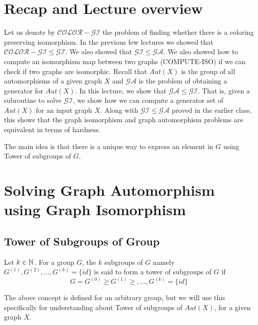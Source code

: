 
\newcommand{\cgi}{\mathcal{COLOR-GI}}
\newcommand{\compiso}{{\sf COMPUTE-ISO}}
\newcommand{\gi}{\mathcal{GI}}
\newcommand{\ga}{\mathcal{GA}}
\newcommand{\setstab}{ {\sf SETSTAB}}
\section{Recap and Lecture overview}
Let us denote by $\cgi$ the problem of finding whether there is a coloring
preserving isomorphism.  In the previous few lectures we showed that $\cgi \le
\gi$. We also showed that $\gi \le \ga$. We also showed how to compute an
isomorphism map between two graphs (\compiso) if we can check if two graphs are
isomorphic. Recall that $Aut(X)$ is the group of all automorphisms of a given
graph $X$ and $\ga$ is the problem of obtaining a generator for $Aut(X)$.  
In this lecture, we show that $\ga \le \gi$. That is, given a
subroutine to solve $\gi$, we show how we can compute a generator set of
$Aut(X)$ for an input graph $X$. Along with
$\gi \le \ga$ proved in the earlier class, this shows that the graph
isomorphism and graph automorphism problems are equivalent in terms of
hardness.

The main idea is that there is a unique way to express an element in
$G$ using Tower of subgroups of $G$.

\section{Solving Graph Automorphism using Graph Isomorphism}

\subsection{Tower of Subgroups of Group}
\begin{definition}
	Let $k \in \mathbb{N}$. For a group $G$, the $k$ subgroups of $G$ namely
	$G^{(1)}, G^{(2)}, \ldots,  G^{(k)} = \{id\}$ is said to form a tower
	of subgroups of $G$ if \[ G = G^{(0)} \ge G^{(1)} \ge ,\ldots ,
	G^{(k)} = \{id\} \] 
\end{definition}
The above concept is defined for an arbitrary group, but we will use this
specifically for understanding about Tower of subgroups of $Aut(X)$, for a
given graph $X$.

